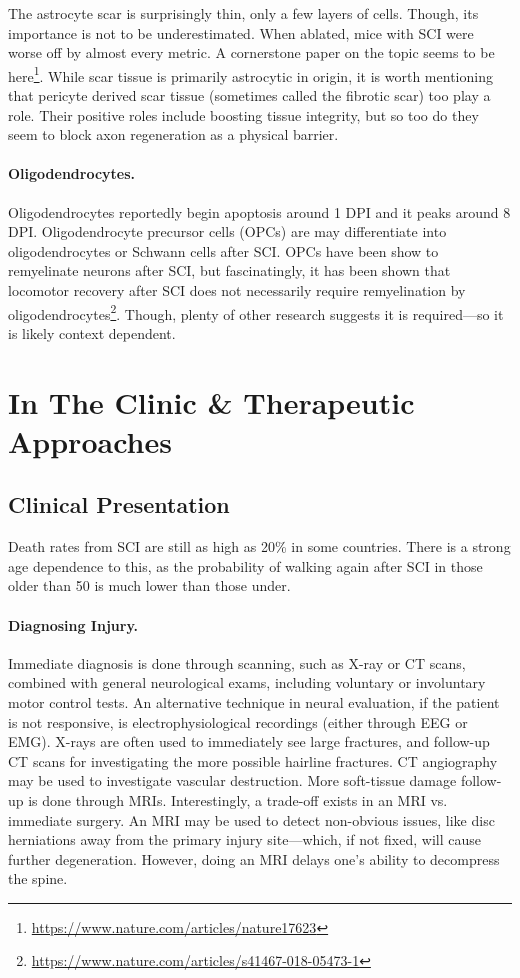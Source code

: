 \documentclass[12pt]{report}
\begin{document}
The astrocyte scar is surprisingly thin, only a few layers of cells. Though, its importance is not to be underestimated. When ablated, mice with SCI were worse off by almost every metric. A cornerstone paper on the topic seems to be here\footnote{\url{https://www.nature.com/articles/nature17623}}. While scar tissue is primarily astrocytic in origin, it is worth mentioning that pericyte derived scar tissue (sometimes called the fibrotic scar) too play a role. Their positive roles include boosting tissue integrity, but so too do they seem to block axon regeneration as a physical barrier. 

\subsubsection{Oligodendrocytes.}
Oligodendrocytes reportedly begin apoptosis around 1 DPI and it peaks around 8 DPI. Oligodendrocyte precursor cells (OPCs) are may differentiate into oligodendrocytes or Schwann cells after SCI. OPCs have been show to remyelinate neurons after SCI, but fascinatingly, it has been shown that locomotor recovery after SCI does not necessarily require remyelination by oligodendrocytes\footnote{\url{https://www.nature.com/articles/s41467-018-05473-1}}. Though, plenty of other research suggests it is required---so it is likely context dependent. 

\chapter{In The Clinic \& Therapeutic Approaches}


\section{Clinical Presentation}
Death rates from SCI are still as high as 20\% in some countries. There is a strong age dependence to this, as the probability of walking again after SCI in those older than 50 is much lower than those under.

\subsubsection{Diagnosing Injury.}
Immediate diagnosis is done through scanning, such as X-ray or CT scans, combined with general neurological exams, including voluntary or involuntary motor control tests. An alternative technique in neural evaluation, if the patient is not responsive, is electrophysiological recordings (either through EEG or EMG). X-rays are often used to immediately see large fractures, and follow-up CT scans for investigating the more possible hairline fractures. CT angiography may be used to investigate vascular destruction. More soft-tissue damage follow-up is done through MRIs. Interestingly, a trade-off exists in an MRI vs. immediate surgery. An MRI may be used to detect non-obvious issues, like disc herniations away from the primary injury site---which, if not fixed, will cause further degeneration. However, doing an MRI delays one's ability to decompress the spine.\newline
\end{document}

